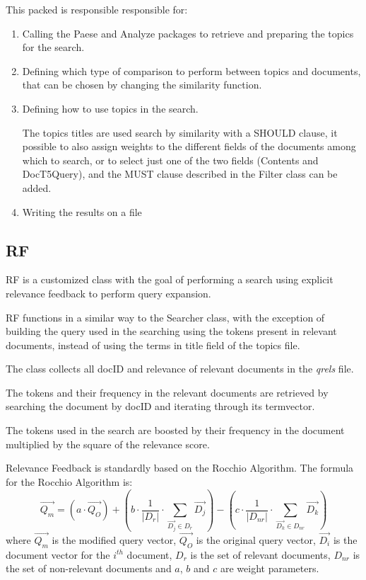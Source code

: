   This packed is responsible responsible for:
    \begin{enumerate}
    	\item Calling the Paese and Analyze packages to retrieve and preparing the topics for the search.
    	\item Defining which type of comparison to perform between topics and documents, that can be chosen by changing the similarity function.
    	\item Defining how to use topics in the search.
    	
    	The topics titles are used search by similarity with a SHOULD clause, it possible to also assign weights to the different fields of the documents among which to search, or to select just one of the two fields (Contents and DocT5Query), and the MUST clause described in the Filter class can be added.
    	\item Writing the results on a file
    \end{enumerate}

\subsection{RF}
        
        RF is a customized class with the goal of performing a search using explicit relevance feedback to perform query expansion.
        
        RF functions in a similar way to the Searcher class, with the exception of building the query used in the searching using the tokens present in relevant documents, instead of using the terms in title field of the topics file.
        
        The class collects all docID and relevance of relevant documents in the \textit{qrels} file.
        
        The tokens and their frequency in the relevant documents are retrieved by searching the document by docID and iterating through its termvector.
        
        The tokens used in the search are boosted by their frequency in the document multiplied by the square of the relevance score.
        
        Relevance Feedback is standardly based on the Rocchio Algorithm.
        The formula for the Rocchio Algorithm is:
        $$
        \overrightarrow{Q_{m}}=
        \left(a\cdot\overrightarrow{Q_{O}}\right)+
        \left(b\cdot\frac{1}{|D_{r}|}\cdot\sum_{\overrightarrow{D_{j}}\in D_{r}}\overrightarrow{D_{j}}\right)-
        \left(c\cdot\frac{1}{|D_{nr}|}\cdot\sum_{\overrightarrow{D_{k}}\in D_{nr}}\overrightarrow{D_{k}}\right)
        $$
        where $\overrightarrow{Q_{m}}$ is the modified query vector, $\overrightarrow{Q_{O}}$ is the original query vector, $\overrightarrow{D_{i}}$ is the document vector for the $i^{th}$ document, $D_{r}$ is the set of relevant documents, $D_{nr}$ is the set of non-relevant documents and $a$, $b$ and $c$ are weight parameters.
        
